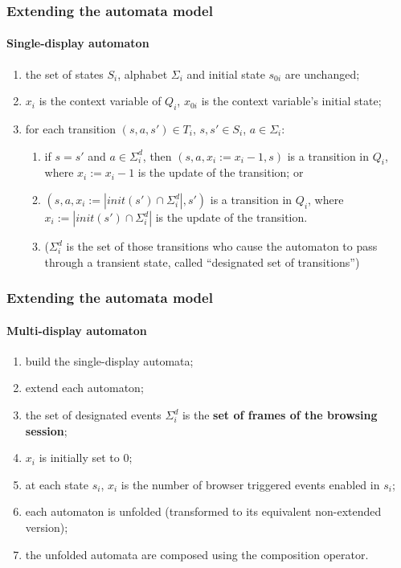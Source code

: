 \documentclass[usenames,dvipsnames]{beamer}
\theoremstyle{definition}
\begin{document}
\begin{frame}
  \frametitle{Extending the automata model}
  \framesubtitle{Single-display automaton}

  \begin{enumerate}
    \item the set of states $S_i$, alphabet $\Sigma_i$ and initial state $s_{0i}$ are unchanged;
    \item $x_i$ is the context variable of $Q_i$, $x_{0i}$ is the context variable's initial state;
    \item for each transition $(s,a,s')\in T_i$, $s,s'\in S_i$, $a\in\Sigma_i$:
      \begin{enumerate}
        \item if $s=s'$ and $a\in\Sigma^d_i$, then $(s,a,x_i := x_i - 1,s)$ is a transition in $Q_i$, where $x_i := x_i - 1$ is the update of the transition; or
        \item $(s,a,x_i := |init(s')\cap \Sigma^d_i|,s')$ is a transition in $Q_i$, where $x_i := |init(s')\cap\Sigma^d_i|$ is the update of the transition.
        \item ($\Sigma^d_i$ is the set of those transitions who cause the automaton to pass through a transient state, called ``designated set of transitions'')
      \end{enumerate}
  \end{enumerate}
\end{frame}


\begin{frame}
  \frametitle{Extending the automata model}
  \framesubtitle{Multi-display automaton}

  \begin{enumerate}
    \item build the single-display automata;
    \item extend each automaton;
    \item the set of designated events $\Sigma^d_i$ is the \textbf{set of frames of the browsing session};
    \item $x_i$ is initially set to 0;
    \item at each state $s_i$, $x_i$ is the number of browser triggered events enabled in $s_i$;
    \item each automaton is unfolded (transformed to its equivalent non-extended version);
    \item the unfolded automata are composed using the composition operator.
  \end{enumerate}
\end{frame}
\end{document}
